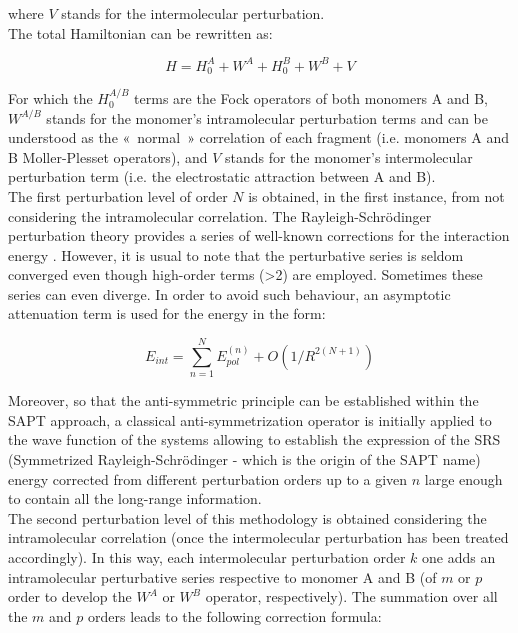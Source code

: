 		where $V$ stands for the intermolecular perturbation.\\
		
		The total Hamiltonian can be rewritten as:
		
		\begin{equation}
		H = H_{0}^{A} + W^{A} + H_{0}^{B} + W^{B} + V
		\end{equation}
		
		For which the $H_{0}^{A/B}$ terms are the Fock operators of both monomers A and B, $W^{A/B}$ stands for the monomer's intramolecular perturbation terms and can be understood as the « normal » correlation of each fragment (i.e. monomers A and B Moller-Plesset operators), and $V$ stands for the monomer's intermolecular perturbation term (i.e. the electrostatic attraction between A and B).\\
		
		The first perturbation level of order $N$ is obtained, in the first instance, from not considering the intramolecular correlation. The Rayleigh-Schr\"{o}dinger perturbation theory provides a series of well-known corrections for the interaction energy \cite{chipman1973perturbation}. However, it is usual to note that the perturbative series is seldom converged even though high-order terms (>2) are employed. Sometimes these series can even diverge. In order to avoid such behaviour, an asymptotic attenuation term is used for the energy in the form:
		
		\begin{equation}
		E_{int} = \sum_{n=1}^{N} E_{pol}^{(n)} + O(1/R^{2 (N+1)})
		\end{equation}
		
		Moreover, so that the anti-symmetric principle can be established within the SAPT approach, a classical anti-symmetrization operator is initially applied to the wave function of the systems allowing to establish the expression of the SRS (Symmetrized Rayleigh-Schr\"{o}dinger - which is the origin of the SAPT name) energy corrected from different perturbation orders up to a given $n$ large enough to contain all the long-range information.\\
		
		The second perturbation level of this methodology is obtained considering the intramolecular correlation (once the intermolecular perturbation has been treated accordingly). In this way, each intermolecular perturbation order $k$ one adds an intramolecular perturbative series respective to monomer A and B (of $m$ or $p$ order to develop the $W^{A}$ or $W^{B}$ operator, respectively). The summation over all the $m$ and $p$ orders leads to the following correction formula:
		
